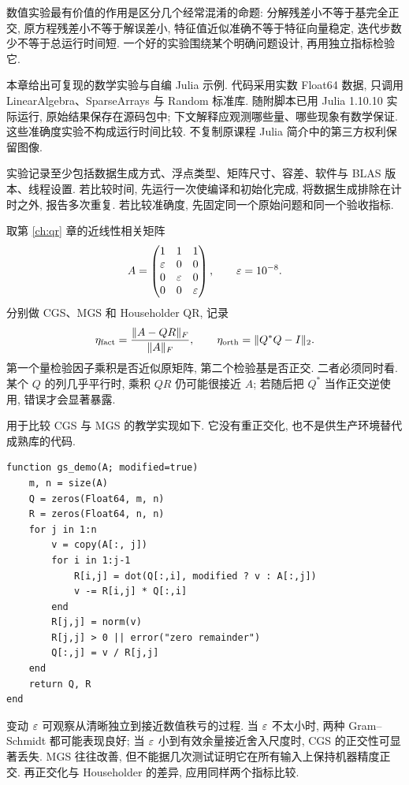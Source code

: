 \label{ch:experiment}
数值实验最有价值的作用是区分几个经常混淆的命题: 分解残差小不等于基完全正交, 原方程残差小不等于解误差小, 特征值近似准确不等于特征向量稳定, 迭代步数少不等于总运行时间短. 一个好的实验围绕某个明确问题设计, 再用独立指标检验它.

本章给出可复现的数学实验与自编 Julia 示例. 代码采用实数 Float64 数据, 只调用 LinearAlgebra、SparseArrays 与 Random 标准库. 随附脚本已用 Julia 1.10.10 实际运行, 原始结果保存在源码包中; 下文解释应观测哪些量、哪些现象有数学保证. 这些准确度实验不构成运行时间比较. 不复制原课程 Julia 简介中的第三方权利保留图像.

实验记录至少包括数据生成方式、浮点类型、矩阵尺寸、容差、软件与 BLAS 版本、线程设置. 若比较时间, 先运行一次使编译和初始化完成, 将数据生成排除在计时之外, 报告多次重复. 若比较准确度, 先固定同一个原始问题和同一个验收指标.

取第 \ref{ch:qr} 章的近线性相关矩阵
\[
A=\begin{pmatrix}1&1&1\\\varepsilon&0&0\\0&\varepsilon&0\\0&0&\varepsilon\end{pmatrix},\qquad \varepsilon=10^{-8}.
\]
分别做 CGS、MGS 和 Householder QR, 记录
\[
\eta_{\rm fact}=\frac{\lVert A-QR\rVert_F}{\lVert A\rVert_F},\qquad
\eta_{\rm orth}=\lVert Q^*Q-I\rVert_2.
\]
第一个量检验因子乘积是否近似原矩阵, 第二个检验基是否正交. 二者必须同时看. 某个 $Q$ 的列几乎平行时, 乘积 $QR$ 仍可能很接近 $A$; 若随后把 $Q^*$ 当作正交逆使用, 错误才会显著暴露.

用于比较 CGS 与 MGS 的教学实现如下. 它没有重正交化, 也不是供生产环境替代成熟库的代码.
\begin{verbatim}
function gs_demo(A; modified=true)
    m, n = size(A)
    Q = zeros(Float64, m, n)
    R = zeros(Float64, n, n)
    for j in 1:n
        v = copy(A[:, j])
        for i in 1:j-1
            R[i,j] = dot(Q[:,i], modified ? v : A[:,j])
            v -= R[i,j] * Q[:,i]
        end
        R[j,j] = norm(v)
        R[j,j] > 0 || error("zero remainder")
        Q[:,j] = v / R[j,j]
    end
    return Q, R
end
\end{verbatim}
变动 $\varepsilon$ 可观察从清晰独立到接近数值秩亏的过程. 当 $\varepsilon$ 不太小时, 两种 Gram--Schmidt 都可能表现良好; 当 $\varepsilon$ 小到有效余量接近舍入尺度时, CGS 的正交性可显著丢失. MGS 往往改善, 但不能据几次测试证明它在所有输入上保持机器精度正交. 再正交化与 Householder 的差异, 应用同样两个指标比较.

